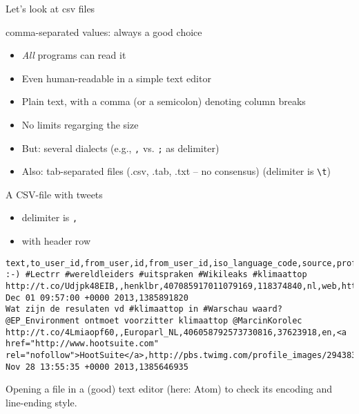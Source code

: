 \documentclass[compress]{beamer}
\begin{document}
\begin{frame}{Let's look at csv files}
	\begin{block}{comma-separated values: always a good choice}
		\begin{itemize}
			\item \emph{All} programs can read it
			\item Even human-readable in a simple text editor
			\item Plain text, with a comma (or a semicolon) denoting column breaks
			\item No limits regarging the size
			\item But: several dialects (e.g., \texttt{,} vs. \texttt{;} as delimiter)
			\item Also: tab-separated files (.csv, .tab, .txt -- no consensus) (delimiter is \texttt{\textbackslash t})
		\end{itemize}
	\end{block}
\end{frame}


\begin{frame}[fragile]{A CSV-file with tweets}
	\begin{itemize}
		\item delimiter is \texttt{,}
		\item with  header row
	\end{itemize}
	\begin{lstlisting}
text,to_user_id,from_user,id,from_user_id,iso_language_code,source,profile_image_url,geo_type,geo_coordinates_0,geo_coordinates_1,created_at,time
:-) #Lectrr #wereldleiders #uitspraken #Wikileaks #klimaattop http://t.co/Udjpk48EIB,,henklbr,407085917011079169,118374840,nl,web,http://pbs.twimg.com/profile_images/378800000673845195/b47785b1595e6a1c63b93e463f3d0ccc_normal.jpeg,,0,0,Sun Dec 01 09:57:00 +0000 2013,1385891820
Wat zijn de resulaten vd #klimaattop in #Warschau waard? @EP_Environment ontmoet voorzitter klimaattop @MarcinKorolec http://t.co/4Lmiaopf60,,Europarl_NL,406058792573730816,37623918,en,<a href="http://www.hootsuite.com" rel="nofollow">HootSuite</a>,http://pbs.twimg.com/profile_images/2943831271/b6631b23a86502fae808ca3efde23d0d_normal.png,,0,0,Thu Nov 28 13:55:35 +0000 2013,1385646935
\end{lstlisting}
\end{frame}



\begin{frame}[plain]

Opening a file in a (good) text editor (here: Atom) to check its encoding and line-ending style.
\end{frame}
\end{document}
